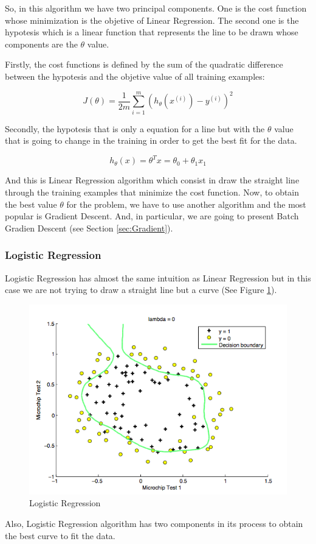 \documentclass[12pt]{article}
\begin{document}
So, in this algorithm we have two principal components. One is the cost function whose minimization is the objetive of Linear Regression. The second one is the hypotesis which is a linear function that represents the line to be drawn whose components are the $\theta$ value. 

Firstly, the cost functions is defined by the sum of the quadratic difference between the hypotesis and the objetive value of all training examples:

\begin{equation}
  J(\theta)=\frac{1}{2m} \displaystyle\sum_{i=1}^{m} (h_{\theta}(x^{(i)})-y^{(i)})^2
\end{equation}

Secondly, the hypotesis that is only a equation for a line but with the $\theta$ value that is going to change in the training in order to get the best fit for the data.

\begin{equation}
  h_{\theta}(x)=\theta^Tx=\theta_{0}+\theta_{1}x_{1}
\end{equation}

And this is Linear Regression algorithm which consist in draw the straight line through the training examples that minimize the cost function. Now, to obtain the best value $\theta$ for the problem, we have to use another algorithm and the most popular is Gradient Descent. And, in particular, we are going to present Batch Gradien Descent (see Section \ref{sec:Gradient}).

\subsubsection{Logistic Regression}
\label{sec:Logisic}
Logistic Regression has almost the same intuition as Linear Regression but in this case we are not trying to draw a straight line but a curve (See Figure \ref{fig:figure4}).
\begin{figure}[ht]
\centering
\includegraphics[width=.4\textwidth]{Logistic.png}
\caption{Logistic Regression}
\label{fig:figure4}
\end{figure}
Also, Logistic Regression algorithm has two components in its process to obtain the best curve to fit the data.
\end{document}
